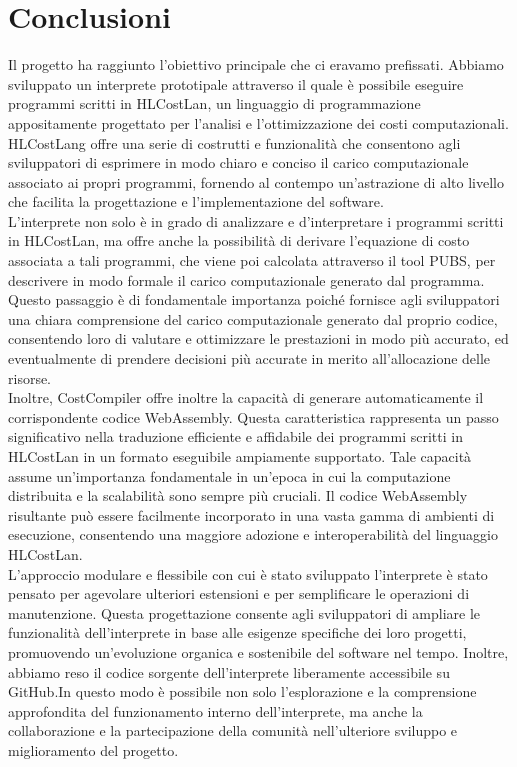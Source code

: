 \documentclass[../../main.tex]{subfiles}
\begin{document}
\chapter{Conclusioni}
Il progetto ha raggiunto l'obiettivo principale che ci eravamo prefissati. Abbiamo sviluppato un interprete prototipale attraverso il quale è possibile eseguire programmi scritti in HLCostLan, un linguaggio di programmazione appositamente progettato per l'analisi e l'ottimizzazione dei costi computazionali. HLCostLang offre una serie di costrutti e funzionalità che consentono agli sviluppatori di esprimere in modo chiaro e conciso il carico computazionale associato ai propri programmi, fornendo al contempo un'astrazione di alto livello che facilita la progettazione e l'implementazione del software.\\
L'interprete non solo è in grado di analizzare e d'interpretare i programmi scritti in HLCostLan, ma offre anche la possibilità di derivare l'equazione di costo associata a tali programmi, che viene poi calcolata attraverso il tool PUBS, per descrivere in modo formale il carico computazionale generato dal programma. Questo passaggio è di fondamentale importanza poiché fornisce agli sviluppatori una chiara comprensione del carico computazionale generato dal proprio codice, consentendo loro di valutare e ottimizzare le prestazioni in modo più accurato, ed eventualmente di prendere decisioni più accurate in merito all'allocazione delle risorse.\\
Inoltre, CostCompiler offre inoltre la capacità di generare automaticamente il corrispondente codice WebAssembly. Questa caratteristica rappresenta un passo significativo nella traduzione efficiente e affidabile dei programmi scritti in HLCostLan in un formato eseguibile ampiamente supportato. Tale capacità assume un'importanza fondamentale in un'epoca in cui la computazione distribuita e la scalabilità sono sempre più cruciali. Il codice WebAssembly risultante può essere facilmente incorporato in una vasta gamma di ambienti di esecuzione, consentendo una maggiore adozione e interoperabilità del linguaggio HLCostLan.\\
L'approccio modulare e flessibile con cui è stato sviluppato l'interprete è stato pensato per agevolare ulteriori estensioni e per semplificare le operazioni di manutenzione. Questa progettazione consente agli sviluppatori di ampliare le funzionalità dell'interprete in base alle esigenze specifiche dei loro progetti, promuovendo un'evoluzione organica e sostenibile del software nel tempo. Inoltre, abbiamo reso il codice sorgente dell'interprete liberamente accessibile su GitHub.In questo modo è possibile non solo l'esplorazione e la comprensione approfondita del funzionamento interno dell'interprete, ma anche la collaborazione e la partecipazione della comunità nell'ulteriore sviluppo e miglioramento del progetto.\\
\end{document}
